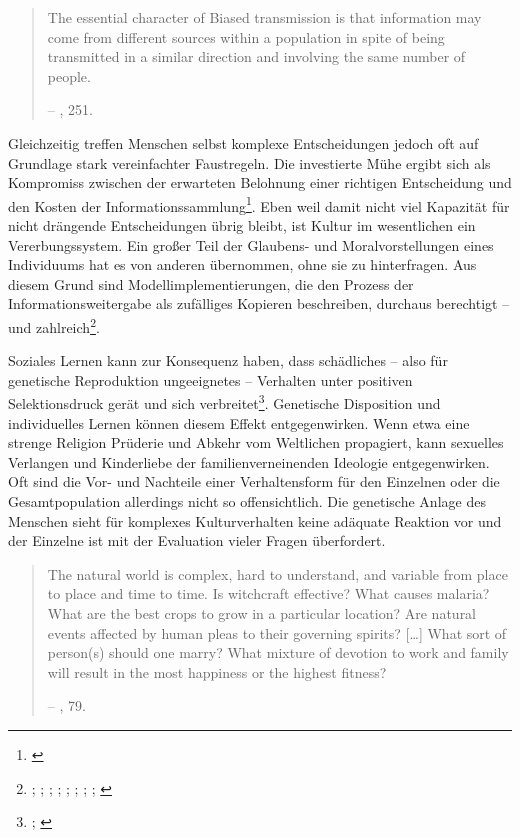 \documentclass[openany,twoside,twocolumn]{book}
\let\rmarkdownfootnote\footnote%
\def\footnote{\protect\rmarkdownfootnote}
\begin{document}
\begin{quote}
The essential character of Biased transmission is that information may come from different sources within a population in spite of being transmitted in a similar direction and involving the same number of people.

-- \textcite{eerkens_cultural_2007}, 251.
\end{quote}

Gleichzeitig treffen Menschen selbst komplexe Entscheidungen jedoch oft auf Grundlage stark vereinfachter Faustregeln. Die investierte Mühe ergibt sich als Kompromiss zwischen der erwarteten Belohnung einer richtigen Entscheidung und den Kosten der Informationssammlung\footnote{\textcite{nisbett_human_1980}}. Eben weil damit nicht viel Kapazität für nicht drängende Entscheidungen übrig bleibt, ist Kultur im wesentlichen ein Vererbungssystem. Ein großer Teil der Glaubens- und Moralvorstellungen eines Individuums hat es von anderen übernommen, ohne sie zu hinterfragen. Aus diesem Grund sind Modellimplementierungen, die den Prozess der Informationsweitergabe als zufälliges Kopieren beschreiben, durchaus berechtigt -- und zahlreich\footnote{\textcite{bentley_academic_2006}; \textcite{bentley_cultural_2003}; \textcite{bentley_random_2004-1}; \textcite{hahn_drift_2003}; \textcite{herzog_random_2004}; \textcite{lipo_science_2001}; \textcite{lipo_population_1997}; \textcite{neiman_stylistic_1995}; \textcite{shennan_ceramic_2001}}.

Soziales Lernen kann zur Konsequenz haben, dass schädliches -- also für genetische Reproduktion ungeeignetes -- Verhalten unter positiven Selektionsdruck gerät und sich verbreitet\footnote{\textcite{eerkens_cultural_2007}; \textcite{enquist_evolution_2007}}. Genetische Disposition und individuelles Lernen können diesem Effekt entgegenwirken. Wenn etwa eine strenge Religion Prüderie und Abkehr vom Weltlichen propagiert, kann sexuelles Verlangen und Kinderliebe der familienverneinenden Ideologie entgegenwirken. Oft sind die Vor- und Nachteile einer Verhaltensform für den Einzelnen oder die Gesamtpopulation allerdings nicht so offensichtlich. Die genetische Anlage des Menschen sieht für komplexes Kulturverhalten keine adäquate Reaktion vor und der Einzelne ist mit der Evaluation vieler Fragen überfordert.

\begin{quote}
The natural world is complex, hard to understand, and variable from place to place and time to time. Is witchcraft effective? What causes malaria? What are the best crops to grow in a particular location? Are natural events affected by human pleas to their governing spirits? {[}\ldots{}{]} What sort of person(s) should one marry? What mixture of devotion to work and family will result in the most happiness or the highest fitness?

-- \textcite{smith_cultural_1992}, 79.
\end{quote}
\end{document}
